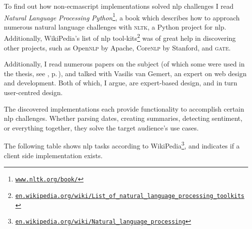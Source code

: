 To find out how non-\gls{ecmascript} implementations solved \gls{nlp}
  challenges I read \emph{Natural Language Processing
  Python}\footnote{
    \href{http://www.nltk.org/book/}{\nolinkurl{www.nltk.org/book/}}
  }, a book which describes how to approach numerous natural language
  challenges with \textsc{nltk}, a Python project for \gls{nlp}.
Additionally, WikiPedia's list of \gls{nlp} tool-kits\footnote{
    \href{http://en.wikipedia.org/wiki/List_of_natural_language_processing_toolkits}{\nolinkurl{en.wikipedia.org/wiki/List_of_natural_language_processing_toolkits}}
  } was of great help in discovering other projects, such as Open\textsc{nlp}
  by Apache, Core\textsc{nlp} by Stanford, and \textsc{gate}.

Additionally, I read numerous papers on the subject (of which some were used in
  the thesis, see \bibname, p.\,\pageref{works-cited}), and talked with
  Vasilis van Gemert, an expert on web design and development.
Both of which, I argue, are expert-based design, and in turn user-centred
  design.

The discovered implementations each provide functionality to accomplish
  certain \gls{nlp} challenges.
Whether parsing dates, creating summaries, detecting sentiment, or everything
  together, they solve the target audience's use cases.

The following table shows \gls{nlp} tasks according to
  WikiPedia\footnote{
    \href{http://en.wikipedia.org/wiki/Natural_language_processing}{\nolinkurl{en.wikipedia.org/wiki/Natural_language_processing}}
  }, and indicates if a client side implementation exists.
\medskip


